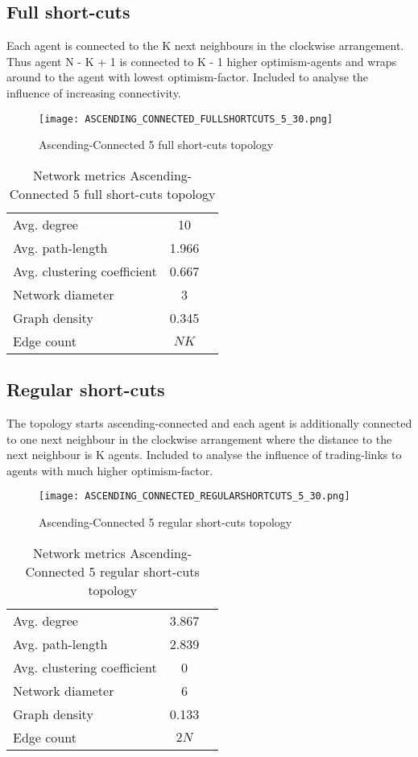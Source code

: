 \documentclass[Bachelorarbeit.tex]{subfiles}
\begin{document}
\subsection{Full short-cuts}
Each agent is connected to the K next neighbours in the clockwise arrangement. Thus agent N - K + 1 is connected to K - 1 higher optimism-agents and wraps around to the agent with lowest optimism-factor.
\medskip
Included to analyse the influence of increasing connectivity.

\begin{figure}[H]
	\centering
  \texttt{[image: ASCENDING\_CONNECTED\_FULLSHORTCUTS\_5\_30.png]}
	\caption{Ascending-Connected 5 full short-cuts topology}
	\label{fig:topology_ASCENDING_CONNECTED_FULLSHORTCUTS_5_30}
\end{figure}

\begin{table}[h]
	\centering
	\caption{Network metrics Ascending-Connected 5 full short-cuts topology}
	\begin{tabular} { l c r }
		\hline
		Avg. degree & 10 \\
		Avg. path-length & 1.966 \\
		Avg. clustering coefficient & 0.667 \\
		Network diameter & 3 \\
		Graph density & 0.345 \\
		Edge count & $NK$ \\
		\hline
	\end{tabular}
\end{table}

\subsection{Regular short-cuts}
The topology starts ascending-connected and each agent is additionally connected to one next neighbour in the clockwise arrangement where the distance to the next neighbour is K agents.
\medskip
Included to analyse the influence of trading-links to agents with much higher optimism-factor.

\begin{figure}[H]
	\centering
  \texttt{[image: ASCENDING\_CONNECTED\_REGULARSHORTCUTS\_5\_30.png]}
	\caption{Ascending-Connected 5 regular short-cuts topology}
	\label{fig:topology_ASCENDING_CONNECTED_REGULARSHORTCUTS_5_30}
\end{figure}

\begin{table}[h]
	\centering
	\caption{Network metrics Ascending-Connected 5 regular short-cuts topology}
	\begin{tabular} { l c r }
		\hline
		Avg. degree & 3.867 \\
		Avg. path-length & 2.839 \\
		Avg. clustering coefficient & 0 \\
		Network diameter & 6 \\
		Graph density & 0.133\\
		Edge count & $2N$ \\
		\hline
	\end{tabular}
\end{table}
\end{document}

